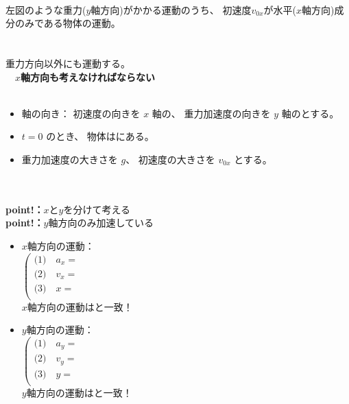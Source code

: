 \documentclass[11pt,twoside]{article}
\begin{document}
	\begin{minipage}[t]{0.58\linewidth}
		\\
		左図のような重力($y$軸方向)がかかる運動のうち、
		初速度$v_{0x}$が水平($x$軸方向)成分のみである物体の運動。\\\\
		\\
		重力方向以外にも運動する。\\
		　\to \textbf{$x$軸方向も考えなければならない}\\\\
			\begin{itemize}[leftmargin=2em,itemsep=0pt,topsep=2pt]
				\item[(i)]
				軸の向き：
				初速度の向きを $x$ 軸の\underline{\hspace{0.75cm}}、
				重力加速度の向きを $y$ 軸の\underline{\hspace{0.75cm}}とする。

				\item[(ii)]
				$t=0$ のとき、
				物体は\underline{\hspace{3.5cm}}にある。

				\item[(iii)]
				重力加速度の大きさを $g$、
				初速度の大きさを $v_{0x}$ とする。
			\end{itemize}
			　\\
		　\\
		\textbf{point!：}$x$と$y$を分けて考える\\
		\textbf{point!：}$y$軸方向のみ加速している
		\begin{itemize}[leftmargin=2em,itemsep=0pt,topsep=2pt]
			\item[(i)]
			$x$軸方向の運動：\\
			\(
			\left(
			\begin{array}{ll}
				\text{(1)} \quad a_x = & \\
				\text{(2)} \quad v_x = & \\
				\text{(3)} \quad x = & \\
			\end{array}
			\right.
			\)\\
			\to $x$軸方向の運動は\underline{\hspace{3.5cm}}と一致！\\
			\item[(ii)]
			$y$軸方向の運動：\\
			\(
			\left(
			\begin{array}{ll}
				\text{(1)} \quad a_y = & \\
				\text{(2)} \quad v_y = & \\
				\text{(3)} \quad y = & \\
			\end{array}
			\right.
			\)\\
			\to $y$軸方向の運動は\underline{\hspace{3.5cm}}と一致！
		\end{itemize}
	\end{minipage}
\newpage
\end{document}

